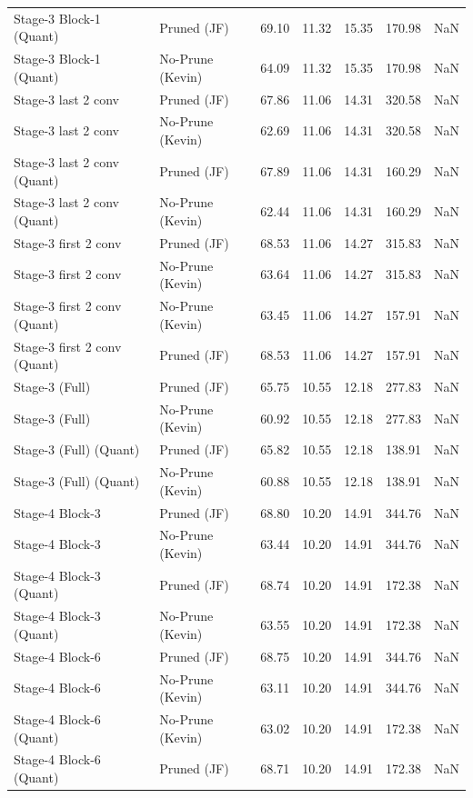 \begin{table}
\begin{tabular}{llrrrrl}
Stage-3 Block-1
(Quant) & Pruned (JF) & 69.10 & 11.32 & 15.35 & 170.98 & NaN \\
Stage-3 Block-1
(Quant) & No-Prune (Kevin) & 64.09 & 11.32 & 15.35 & 170.98 & NaN \\
Stage-3 last 2 conv & Pruned (JF) & 67.86 & 11.06 & 14.31 & 320.58 & NaN \\
Stage-3 last 2 conv & No-Prune (Kevin) & 62.69 & 11.06 & 14.31 & 320.58 & NaN \\
Stage-3 last 2 conv
(Quant) & Pruned (JF) & 67.89 & 11.06 & 14.31 & 160.29 & NaN \\
Stage-3 last 2 conv
(Quant) & No-Prune (Kevin) & 62.44 & 11.06 & 14.31 & 160.29 & NaN \\
Stage-3 first 2 conv & Pruned (JF) & 68.53 & 11.06 & 14.27 & 315.83 & NaN \\
Stage-3 first 2 conv & No-Prune (Kevin) & 63.64 & 11.06 & 14.27 & 315.83 & NaN \\
Stage-3 first 2 conv
(Quant) & No-Prune (Kevin) & 63.45 & 11.06 & 14.27 & 157.91 & NaN \\
Stage-3 first 2 conv
(Quant) & Pruned (JF) & 68.53 & 11.06 & 14.27 & 157.91 & NaN \\
Stage-3 (Full) & Pruned (JF) & 65.75 & 10.55 & 12.18 & 277.83 & NaN \\
Stage-3 (Full) & No-Prune (Kevin) & 60.92 & 10.55 & 12.18 & 277.83 & NaN \\
Stage-3 (Full)
(Quant) & Pruned (JF) & 65.82 & 10.55 & 12.18 & 138.91 & NaN \\
Stage-3 (Full)
(Quant) & No-Prune (Kevin) & 60.88 & 10.55 & 12.18 & 138.91 & NaN \\
Stage-4 Block-3 & Pruned (JF) & 68.80 & 10.20 & 14.91 & 344.76 & NaN \\
Stage-4 Block-3 & No-Prune (Kevin) & 63.44 & 10.20 & 14.91 & 344.76 & NaN \\
Stage-4 Block-3
(Quant) & Pruned (JF) & 68.74 & 10.20 & 14.91 & 172.38 & NaN \\
Stage-4 Block-3
(Quant) & No-Prune (Kevin) & 63.55 & 10.20 & 14.91 & 172.38 & NaN \\
Stage-4 Block-6 & Pruned (JF) & 68.75 & 10.20 & 14.91 & 344.76 & NaN \\
Stage-4 Block-6 & No-Prune (Kevin) & 63.11 & 10.20 & 14.91 & 344.76 & NaN \\
Stage-4 Block-6
(Quant) & No-Prune (Kevin) & 63.02 & 10.20 & 14.91 & 172.38 & NaN \\
Stage-4 Block-6
(Quant) & Pruned (JF) & 68.71 & 10.20 & 14.91 & 172.38 & NaN \\

\end{tabular}
\end{table}
